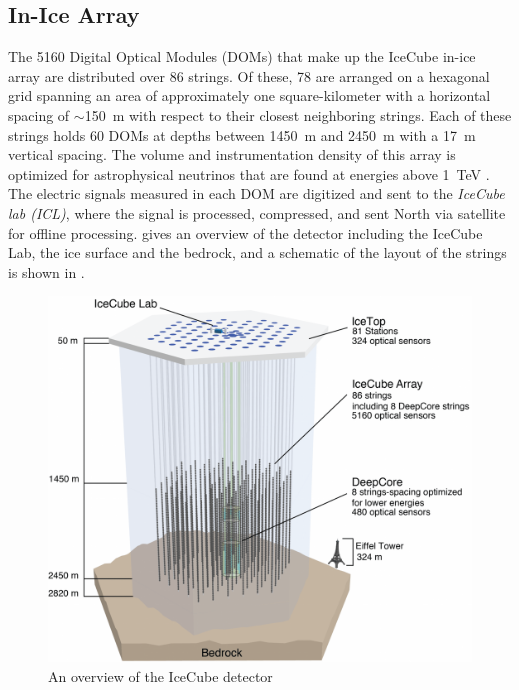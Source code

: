 \subsection{In-Ice Array}
The 5160 Digital Optical Modules (DOMs) that make up the IceCube in-ice array are distributed over 86 strings.
Of these, 78 are arranged on a hexagonal grid spanning an area of approximately one square-kilometer with a horizontal spacing of $\sim$150~m with respect to their closest neighboring strings. Each of these strings holds 60 DOMs at depths between 1450~m and 2450~m with a 17~m vertical spacing.
The volume and instrumentation density of this array is optimized for astrophysical neutrinos that are found at energies above 1~TeV \cite{icecube_detector_17}.
The electric signals measured in each DOM are digitized  and sent to the \emph{IceCube lab (ICL)}, where the signal is processed, compressed, and sent North via satellite for offline processing.
 gives an overview of the detector including the IceCube Lab, the ice surface and the bedrock, and a schematic of the layout of the strings is shown in .

\begin{figure}
	\centering \includegraphics{figures/icecube/IceCubeArray_slim.png}
	\caption{An overview of the IceCube detector}
	\label{fig:ic_detector}
\end{figure}

